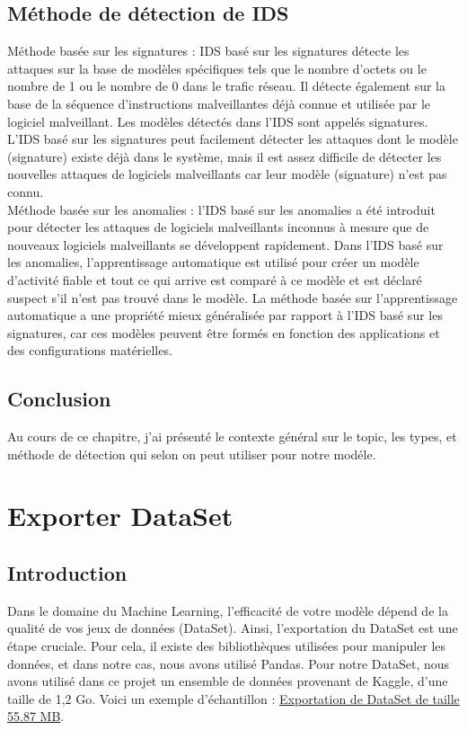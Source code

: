 \documentclass[a4paper,12pt]{report}
\begin{document}
\section{Méthode de détection de IDS}
\normalsize \noindent \textcolor{colortxt}{Méthode basée sur les signatures :} IDS basé sur les signatures détecte les attaques sur la base de modèles spécifiques tels que le nombre d'octets ou le nombre de 1 ou le nombre de 0 dans le trafic réseau. Il détecte également sur la base de la séquence d'instructions malveillantes déjà connue et utilisée par le logiciel malveillant. Les modèles détectés dans l'IDS sont appelés signatures. L'IDS basé sur les signatures peut facilement détecter les attaques dont le modèle (signature) existe déjà dans le système, mais il est assez difficile de détecter les nouvelles attaques de logiciels malveillants car leur modèle (signature) n'est pas connu.\\[0.2cm]
\normalsize \noindent \textcolor{colortxt}{Méthode basée sur les anomalies :} l'IDS basé sur les anomalies a été introduit pour détecter les attaques de logiciels malveillants inconnus à mesure que de nouveaux logiciels malveillants se développent rapidement. Dans l'IDS basé sur les anomalies, l'apprentissage automatique est utilisé pour créer un modèle d'activité fiable et tout ce qui arrive est comparé à ce modèle et est déclaré suspect s'il n'est pas trouvé dans le modèle. La méthode basée sur l'apprentissage automatique a une propriété mieux généralisée par rapport à l'IDS basé sur les signatures, car ces modèles peuvent être formés en fonction des applications et des configurations matérielles.
\section{Conclusion}
\noindent \normalsize Au cours de ce chapitre, j'ai présenté le contexte général sur le topic, les types, et méthode de détection qui selon on peut utiliser pour notre modéle. 



\renewcommand{\chaptername}{Chapter}
\chapter{Exporter DataSet}

\newpage
\pagestyle{plain} 
\section {Introduction}
\noindent\normalsize Dans le domaine du Machine Learning, l’efficacité de votre modèle dépend de la qualité de vos jeux de données (DataSet). Ainsi, l'exportation du DataSet est une étape cruciale. Pour cela, il existe des bibliothèques utilisées pour manipuler les données, et dans notre cas, nous avons utilisé Pandas.
\noindent\normalsize Pour notre DataSet, nous avons utilisé dans ce projet un ensemble de données provenant de \textcolor{colortxt}{Kaggle}, d'une taille de 1,2 Go. Voici un exemple d'échantillon : \href{https://www.kaggle.com/datasets/hassan06/nslkdd}{Exportation de DataSet de taille 55.87 MB}.
\end{document}
